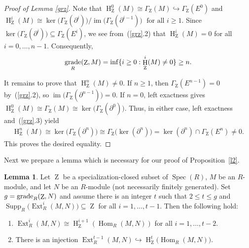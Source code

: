 \documentclass[11pt]{amsart}
\theoremstyle{definition}
\theoremstyle{definition}
\newtheorem{lem}[thm]{Lemma}
\numberwithin{equation}{section}
\DeclareMathOperator{\gr}{\textnormal{grade}}
\DeclareMathOperator{\mz}{Z}
\DeclareMathOperator{\Ext}{Ext}
\DeclareMathOperator{\hh}{H}
\DeclareMathOperator{\Hom}{Hom}
\DeclareMathOperator{\im}{im}
\DeclareMathOperator{\Supp}{Supp}
\DeclareMathOperator{\Spec}{Spec}
\begin{document}
\begin{proof}[Proof of Lemma \ref{grz}]
Note that
$\hh^0_{\mz}(M)\cong\Gamma_{\mz}(M)
\hookrightarrow\Gamma_{\mz}(E^0)$
and
$\hh^i_{\mz}(M)
\cong
\ker\bigl(\Gamma_{\mz}(\partial^i)\bigr)/
\im\bigl(\Gamma_{\mz}(\partial^{i-1})\bigr)\;
\text{ for all }i\geq1$. Since $\ker\bigl(\Gamma_{\mz}(\partial^i)\bigr)
\subseteq\Gamma_{\mz}(E^i)$,
we see from~(\ref{grz}.2) that
$\hh^i_{\mz}(M)=0$ for all $i=0, \ldots, n-1$. Consequently,
\[
\gr_R(\mz,M)=\inf\{i\geq0:\hh^i_{\mz}(M)\neq0\}\geq n.
\]

It remains to prove that $\hh^n_{\mz}(M)\neq0$.
If $n\geq1$, then $\Gamma_{\mz}(E^{n-1})=0$
by~(\ref{grz}.2), so
$\im\bigl(\Gamma_{\mz}(\partial^{n-1})\bigr)=0$.
If $n=0$, left exactness gives $\hh^0_{\mz}(M)
\cong\Gamma_{\mz}(M)
\cong\ker\bigl(\Gamma_{\mz}(\partial^0)\bigr)$. Thus, in either case, left exactness and~(\ref{grz}.3) yield
\[
\begin{aligned}
\hh^n_{\mz}(M)\cong\ker\bigl(\Gamma_{\mz}(\partial^n)\bigr)\cong\Gamma_{\mz}\bigl(\ker(\partial^n)\bigr)=\ker(\partial^n)\cap\Gamma_{\mz}(E^n)
\neq0.
\end{aligned}
\]
This proves the desired equality.
\end{proof}

Next we prepare a lemma which is necessary for our proof of Proposition~\ref{l2}. 

\begin{lem}\label{t1} Let $\mz$ be a specialization-closed subset of $\Spec(R)$, $M$ be an $R$-module, and let $N$ be an $R$-module (not necessarily finitely generated). Set $g=\gr_R(\mz,N)$ and assume there is an integer $t$ such that $2\leq t\leq g$ and $\Supp_R\big(\Ext^i_R(M,N)\big)\subseteq\mz$ for all $i=1, \ldots, t-1$. Then the following hold:
\begin{enumerate}[\rm(i)]
\item $\Ext^i_R(M,N)\cong\hh_{\mz}^{i+1}\left(\Hom_R(M,N)\right)$ for all $i=1, \ldots, t-2$.
\item There is an injection $\Ext^{t-1}_R(M,N)\hookrightarrow\hh_{\mz}^{t}\big(\Hom_R(M,N)\big)$.
\end{enumerate}
\end{lem}
\end{document}
